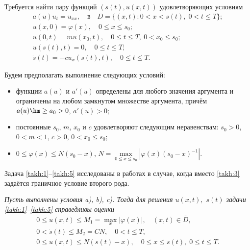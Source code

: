 \smallskip

 Требуется найти пару функций
$(s(t), u(x, t))$ удовлетворяющих  условиям
\begin{gather}
a(u)u_{t}=u_{xx}, \quad \text{в} \quad  D=\{(x,t):0<x<s(t), \; 0<t\leq T \}; 
\label{takh:1}
\\
u(x, 0)=\varphi(x), \quad 0\leq x \leq s_0; 
\label{takh:3}
\\
u(0, t)=mu(x_0,t), \quad 0\leq t \leq T, \ 0< x_0 \leq s_0;
\label{takh:3} 
\\
u(s(t), t)=0,\quad 0\leq t \leq T; 
\label{takh:5}
\\
\dot{s}(t)=-cu_x(s(t),t),\quad 0\leq t \leq T. 
\label{takh:5}
\end{gather}


Будем предполагать выполнение следующих условий:
\begin{itemize}
\item[a)] функции $a(u)$ и $a'(u)$ определены для любого значения
аргумента и ограничены на любом замкнутом множестве аргумента,
причём $a(u)\hm \geq a_0>0$, $a'(u)>0$;

\item[b)] постоянные $s_0$, $m$, $x_0$ и $c$ удовлетворяют следующим неравенствам:
\mbox{$s_0{>}0$}, $0<m<1$, $c>0$, $0<x_0\leq s_0$;


\item[c)] $0\leq \varphi(x)\leq N(s_0-x)$, $N=\max\limits_{0\leq x\leq
s_0}|\varphi (x)(s_0-x)^{-1}|$.
\end{itemize}

Задача \eqref{takh:1}--\eqref{takh:5} исследованы в работах \cite{takh:bib:3, takh:bib:4} в случае, когда вместо \eqref{takh:3} задаётся граничное условие второго рода.

\smallskip


\begin{lemma}\sl Пусть выполнены условия {\rm a), b), c).} Тогда для решения $u(x,t),$ $s(t)$ задачи \eqref{takh:1}--\eqref{takh:5} справедливы оценки
\begin{gather}
0\leq u(x,t)\leq M_1=\max\limits_{x}|\varphi(x)|,\quad  (x,t)\in
\bar{D},\label{takh:6}
\\
0<\dot{s}(t)\leq M_2=CN,\quad  0<t\leq T,\label{takh:7}
\\
0\leq u(x,t)\leq N(s(t)-x),\quad  0\leq x\leq s(t),\; 0\leq t\leq T.
\label{takh:8}
\end{gather}
\end{lemma}


